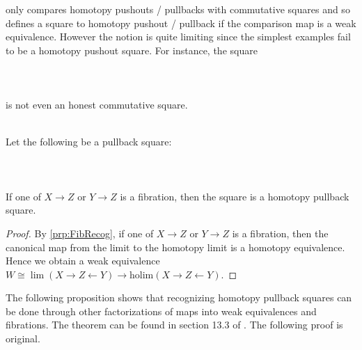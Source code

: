 \documentclass[a4paper]{article}
\begin{document}
\cite{CHT} only compares homotopy pushouts / pullbacks with commutative squares and so defines a square to homotopy pushout / pullback if the comparison map is a weak equivalence. However the notion is quite limiting since the simplest examples fail to be a homotopy pushout square. For instance, the square  
 \\~\\  \\~\\
is not even an honest commutative square. 

\begin{prp}{}{}\\
Let the following be a pullback square:  
 \\~\\  \\~\\
If one of $X\to Z$ or $Y\to Z$ is a fibration, then the square is a homotopy pullback square. 
\begin{proof}
By \ref{prp:FibRecog}, if one of $X\to Z$ or $Y\to Z$ is a fibration, then the canonical map from the limit to the homotopy limit is a homotopy equivalence. Hence we obtain a weak equivalence $W\cong\lim(X\rightarrow Z\leftarrow Y)\to\text{holim}(X\rightarrow Z\leftarrow Y)$. 
\end{proof}
\end{prp}

The following proposition shows that recognizing homotopy pullback squares can be done through other factorizations of maps into weak equivalences and fibrations. The theorem can be found in section 13.3 of \cite{MCL}. The following proof is original. 
\end{document}
